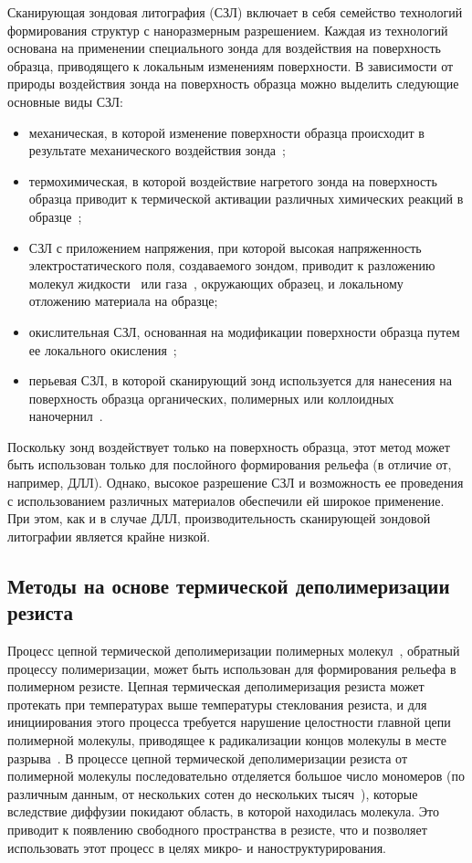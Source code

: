 Сканирующая зондовая литография (СЗЛ) включает в себя семейство технологий формирования структур с наноразмерным разрешением.
Каждая из технологий основана на применении специального зонда для воздействия на поверхность образца, приводящего к локальным изменениям поверхности.
В зависимости от природы воздействия зонда на поверхность образца можно выделить следующие основные виды СЗЛ:
\begin{itemize}
	\item механическая, в которой изменение поверхности образца происходит в результате механического воздействия зонда~\cite{SPL_mechanical};
	\item  термохимическая, в которой воздействие нагретого зонда на поверхность образца приводит к термической активации различных химических реакций в образце~\cite{SPL_termochemical};
	\item СЗЛ с приложением напряжения, при которой высокая напряженность электростатического поля, создаваемого зондом, приводит к разложению молекул жидкости~\cite{SPL_bias_liquid} или газа~\cite{SPL_bias_gas}, окружающих образец, и локальному отложению материала на образце;
	\item окислительная СЗЛ, основанная на модификации поверхности образца путем ее локального окисления~\cite{SPL_oxidation};
	\item перьевая СЗЛ, в которой сканирующий зонд используется для нанесения на поверхность образца органических, полимерных или коллоидных наночернил~\cite{SPL_dip_pen_1, SPL_dip_pen_2}.
\end{itemize}

Поскольку зонд воздействует только на поверхность образца, этот метод может быть использован только для послойного формирования рельефа (в отличие от, например, ДЛЛ). Однако, высокое разрешение СЗЛ и возможность ее проведения с использованием различных материалов обеспечили ей широкое применение. При этом, как и в случае ДЛЛ, производительность сканирующей зондовой литографии является крайне низкой.


\subsection{Методы на основе термической деполимеризации резиста}

Процесс цепной термической деполимеризации полимерных молекул~\cite{depol_general_1}, обратный процессу полимеризации, может быть использован для формирования рельефа в полимерном резисте.
Цепная термическая деполимеризация резиста может протекать при температурах выше температуры стеклования резиста, и для инициирования этого процесса требуется нарушение целостности главной цепи полимерной молекулы, приводящее к радикализации концов молекулы в месте разрыва~\cite{depol_general_2}.
В процессе цепной термической деполимеризации резиста от полимерной молекулы последовательно отделяется большое число мономеров (по различным данным, от нескольких сотен до нескольких тысяч~\cite{Cowley_1952_1, Mita_PMMA_zip_lengths_T, Inaba_zip_len}), которые вследствие диффузии покидают область, в которой находилась молекула.
Это приводит к появлению свободного пространства в резисте, что и позволяет использовать этот процесс в целях микро- и наноструктурирования.

